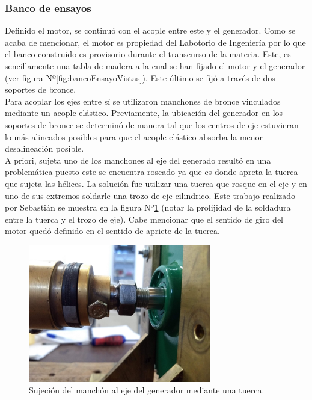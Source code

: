 \documentclass[a4paper,11pt,twoside]{IT-CNEA}
\begin{document}
\subsubsection{Banco de ensayos}
Definido el motor, se continuó con el acople entre este y el generador. Como se acaba de mencionar, el motor es propiedad del Labotorio de Ingeniería por lo que el banco construido es provisorio durante el transcurso de la materia. Este, es sencillamente una tabla de madera a la cual se han fijado el motor y el generador (ver figura Nº\ref{fig:bancoEnsayoVistas}). Este último se fijó a través de dos soportes de bronce. 
\\Para acoplar los ejes entre sí se utilizaron manchones de bronce vinculados mediante un acople elástico. Previamente, la ubicación del generador en los soportes de bronce se determinó de manera tal que los centros de eje estuvieran lo más alineados posibles para que el acople elástico absorba la menor desalineación posible. 
\\A priori, sujeta uno de los manchones al eje del generado resultó en una problemática puesto este se encuentra roscado ya que es donde apreta la tuerca que sujeta las hélices. La solución fue utilizar una tuerca que rosque en el eje y en uno de sus extremos soldarle una trozo de eje cilindrico. Este trabajo realizado por Sebastián se muestra en la figura Nº\ref{fig:EjeGeneradorTuerca} (notar la prolijidad de la soldadura entre la tuerca y el trozo de eje). Cabe mencionar que el sentido de giro del motor quedó definido en el sentido de apriete de la tuerca. 
\begin{figure}[h!]
\centering
\includegraphics[width=8cm]{Figuras/EjeGeneradorTuerca.jpg}
\caption{Sujeción del manchón al eje del generador mediante una tuerca.}
\label{fig:EjeGeneradorTuerca}
\end{figure}
\end{document}
